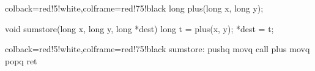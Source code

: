 \documentclass[11pt]{beamer}
\begin{document}
\begin{frame}[fragile]
  \begin{tcblisting}{colback=red!5!white,colframe=red!75!black}
    long plus(long x, long y);

    void sumstore(long x, long y, long *dest)
    {
      long t = plus(x, y);
      *dest = t;
    }
  \end{tcblisting}
  \pause
  \begin{tcblisting}{colback=red!5!white,colframe=red!75!black}
    sumstore:
      pushq   %
      movq    %
      call    plus
      movq    %
      popq    %
      ret
  \end{tcblisting}
\end{frame}
\end{document}
